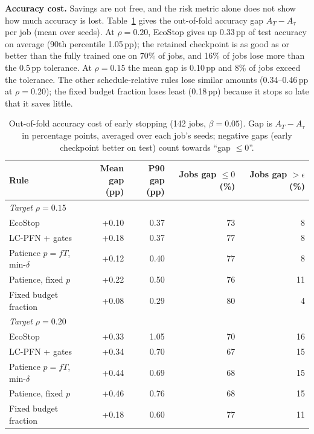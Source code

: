 \documentclass[3p,twocolumn,10pt]{elsarticle}
\theoremstyle{definition}
\begin{document}
\textbf{Accuracy cost.} Savings are not free, and the risk metric alone does not show how much accuracy is lost. Table~\ref{tab:acc} gives the out-of-fold accuracy gap $A_T-A_\tau$ per job (mean over seeds). At $\rho=0.20$, EcoStop gives up 0.33\,pp of test accuracy on average (90th percentile 1.05\,pp); the retained checkpoint is as good as or better than the fully trained one on 70\% of jobs, and 16\% of jobs lose more than the 0.5\,pp tolerance. At $\rho=0.15$ the mean gap is 0.10\,pp and 8\% of jobs exceed the tolerance. The other schedule-relative rules lose similar amounts (0.34--0.46\,pp at $\rho=0.20$); the fixed budget fraction loses least (0.18\,pp) because it stops so late that it saves little.

\begin{table}[t]
\centering
\caption{Out-of-fold accuracy cost of early stopping (142 jobs, $\beta=0.05$). Gap is $A_T-A_\tau$ in percentage points, averaged over each job's seeds; negative gaps (early checkpoint better on test) count towards ``gap $\le0$''.}
\label{tab:acc}
\footnotesize
\begin{adjustbox}{max width=\columnwidth}
\begin{tabular}{p{3.0cm}rrrr}
\toprule
Rule & \shortstack{Mean\\gap (pp)} & \shortstack{P90\\gap (pp)} & \shortstack{Jobs gap\\$\le0$ (\%)} & \shortstack{Jobs gap\\$>\epsilon$ (\%)} \\
\midrule
\multicolumn{5}{l}{\emph{Target $\rho=0.15$}}\\
EcoStop & +0.10 & 0.37 & 73 & 8 \\
LC-PFN + gates & +0.18 & 0.37 & 77 & 8 \\
Patience $p{=}fT$, min-$\delta$ & +0.12 & 0.40 & 77 & 8 \\
Patience, fixed $p$ & +0.22 & 0.50 & 76 & 11 \\
Fixed budget fraction & +0.08 & 0.29 & 80 & 4 \\
\midrule
\multicolumn{5}{l}{\emph{Target $\rho=0.20$}}\\
EcoStop & +0.33 & 1.05 & 70 & 16 \\
LC-PFN + gates & +0.34 & 0.70 & 67 & 15 \\
Patience $p{=}fT$, min-$\delta$ & +0.44 & 0.69 & 68 & 15 \\
Patience, fixed $p$ & +0.46 & 0.76 & 68 & 15 \\
Fixed budget fraction & +0.18 & 0.60 & 77 & 11 \\
\bottomrule
\end{tabular}
\end{adjustbox}
\end{table}
\end{document}
